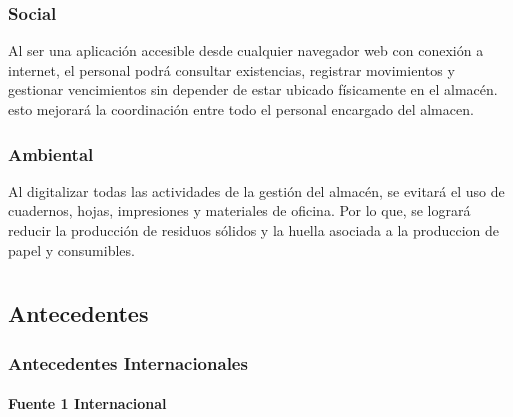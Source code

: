 \documentclass[12pt]{article} %
\begin{document}
\subsubsection{Social}

Al ser una aplicación accesible desde cualquier navegador web con conexión a internet, el personal podrá consultar existencias, registrar movimientos y gestionar vencimientos sin depender de estar ubicado físicamente en el almacén. esto mejorará la coordinación entre todo el personal encargado del almacen.

\subsubsection{Ambiental}

Al digitalizar todas las actividades de la gestión del almacén, se evitará el uso de cuadernos, hojas, impresiones y materiales de oficina. Por lo que, se logrará reducir la producción de residuos sólidos y la huella asociada a la produccion de papel y consumibles.

\section*{}

\subsection{Antecedentes}

\subsubsection{Antecedentes Internacionales}

\paragraph{Fuente 1 Internacional}
\end{document}
